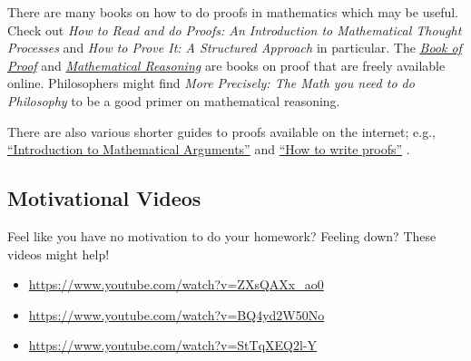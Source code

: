 \documentclass[../../../include/open-logic-section]{subfiles}
\begin{document}

There are many books on how to do proofs in mathematics which may be
useful. Check out \emph{How to Read and do Proofs: An Introduction to
Mathematical Thought Processes} \cite{Solow2013} and \emph{How to
Prove It: A Structured Approach} \cite{Velleman2019} in particular.
The
\href{http://www.people.vcu.edu/~rhammack/BookOfProof/BookOfProof.pdf}{\emph{Book
of Proof}} \cite{Hammack2013} and
\href{https://scholarworks.gvsu.edu/books/7/}{\emph{Mathematical
Reasoning}} \cite{Sandstrum2019} are books on proof that are freely
available online.  Philosophers might find
\emph{More
Precisely: The Math you need to do Philosophy} \cite{Steinhart2018} to
be a good primer on mathematical reasoning. 

There are also various shorter guides to proofs available on the
internet; e.g.,
\href{https://math.berkeley.edu/~hutching/teach/proofs.pdf}{``Introduction
  to Mathematical Arguments''} \cite{Hutchings2003} and
\href{http://http://eugeniacheng.com/wp-content/uploads/2017/02/cheng-proofguide.pdf}{``How to
  write proofs''} \cite{Cheng2004}.

\subsection{Motivational Videos}

Feel like you have no motivation to do your homework? Feeling down? These
videos might help!

\begin{itemize}
\item \url{https://www.youtube.com/watch?v=ZXsQAXx_ao0}
\item \url{https://www.youtube.com/watch?v=BQ4yd2W50No}
\item \url{https://www.youtube.com/watch?v=StTqXEQ2l-Y}
\end{itemize}
\end{document}
